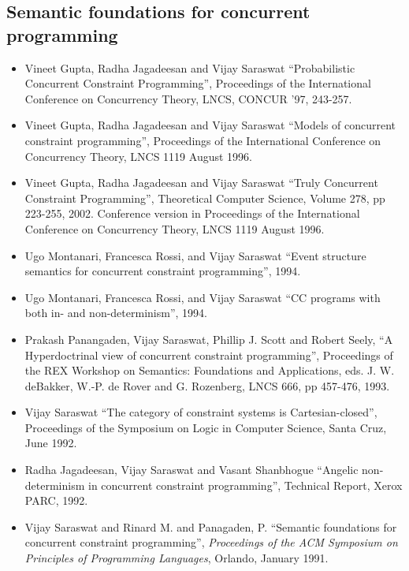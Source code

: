 \documentclass{article}
\begin{document}
\subsection*{Semantic foundations for concurrent programming}
\begin{itemize} 

\item  Vineet Gupta, Radha Jagadeesan and Vijay Saraswat ``Probabilistic
  Concurrent Constraint Programming'', Proceedings of the
  International Conference on Concurrency Theory, LNCS, CONCUR '97,
  243-257.

\item  Vineet Gupta, Radha Jagadeesan and Vijay Saraswat ``Models
  of concurrent constraint programming'', Proceedings of the
  International Conference on Concurrency Theory, LNCS 1119 August
  1996.

\item Vineet Gupta, Radha Jagadeesan and Vijay Saraswat ``Truly
  Concurrent Constraint Programming'', Theoretical Computer Science,
  Volume 278, pp 223-255, 2002. Conference version in Proceedings of
  the International Conference on Concurrency Theory, LNCS 1119 August
  1996.

\item  Ugo Montanari, Francesca Rossi, and Vijay Saraswat ``Event
  structure semantics for concurrent constraint programming'',
  1994.  
  
\item  Ugo Montanari, Francesca Rossi, and Vijay Saraswat ``CC
  programs with both in- and non-determinism'', 1994.

\item  Prakash Panangaden, Vijay Saraswat, Phillip J. Scott and
  Robert Seely, ``A Hyperdoctrinal view of concurrent constraint
  programming'', Proceedings of the REX Workshop on Semantics:
  Foundations and Applications, eds. J. W. deBakker, W.-P. de Rover
  and G. Rozenberg, LNCS 666, pp 457-476, 1993.
  
\item  Vijay Saraswat ``The category of constraint systems is
  Cartesian-closed'', Proceedings of the Symposium on Logic in
  Computer Science, Santa Cruz, June 1992.

\item Radha Jagadeesan, Vijay Saraswat and Vasant Shanbhogue ``Angelic
  non-determinism in concurrent constraint programming'', Technical
  Report, Xerox PARC, 1992.
  
\item  Vijay Saraswat and Rinard M. and Panagaden, P. ``Semantic
  foundations for concurrent constraint programming'', {\em
  Proceedings of the ACM Symposium on Principles of Programming
  Languages}, Orlando, January 1991.
  

\end{itemize}
\end{document}
